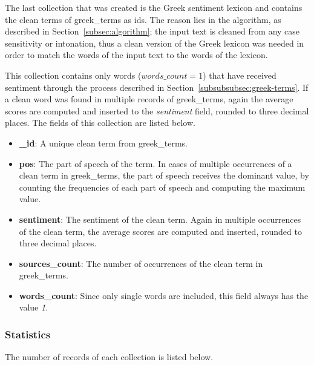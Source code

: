 \label{subsubsubsec:greek-sentiment-terms}

The last collection that was created is the Greek sentiment lexicon
and contains the clean terms of greek\_terms as ids.
The reason lies in the algorithm,
as described in Section~\ref{subsec:algorithm};
the input text is cleaned from any case sensitivity or intonation,
thus a clean version of the Greek lexicon was needed
in order to match the words of the input text to the words of the lexicon.

This collection contains only words ($words\_count = 1$)
that have received sentiment through the process
described in Section~\ref{subsubsubsec:greek-terms}.
If a clean word was found in multiple records of greek\_terms,
again the average scores are computed and inserted
to the \emph{sentiment} field,
rounded to three decimal places.
The fields of this collection are listed below.

\begin{itemize}
 \item \textbf{\_id}: A unique clean term from greek\_terms.
 
 \item \textbf{pos}: The part of speech of the term.
 In cases of multiple occurrences of a clean term in greek\_terms,
 the part of speech receives the dominant value,
 by counting the frequencies of each part of speech
 and computing the maximum value.
 
 \item \textbf{sentiment}: The sentiment of the clean term.
 Again in multiple occurrences of the clean term,
 the average scores are computed and inserted,
 rounded to three decimal places.
 
 \item \textbf{sources\_count}: The number of occurrences
 of the clean term in greek\_terms.
 
 \item \textbf{words\_count}: Since only single words are included,
 this field always has the value \emph{1}.
\end{itemize}

\subsubsection{Statistics}
\label{subsubsec:statistics}

The number of records of each collection is listed below.

